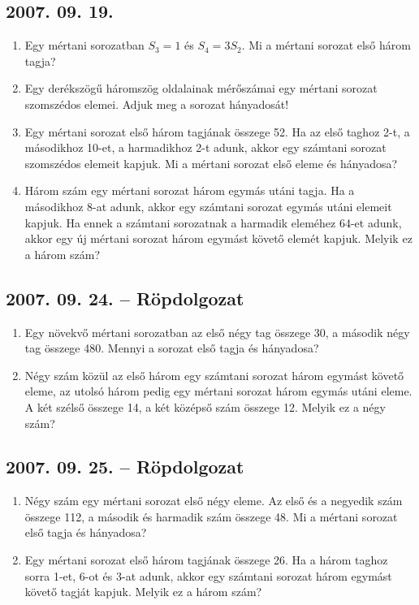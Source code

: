 \subsection*{2007. 09. 19.}
\begin{enumerate}
\item Egy mértani sorozatban $S_3=1$ és $S_4=3S_2$. Mi a mértani sorozat első három tagja?
\item Egy derékszögű háromszög oldalainak mérőszámai egy mértani sorozat szomszédos elemei. Adjuk meg a sorozat hányadosát!
\item Egy mértani sorozat első három tagjának összege 52. Ha az első taghoz 2-t, a másodikhoz 10-et, a harmadikhoz 2-t adunk, akkor egy számtani sorozat szomszédos elemeit kapjuk. Mi a mértani sorozat első eleme és hányadosa?
\item Három szám egy mértani sorozat három egymás utáni tagja. Ha a másodikhoz 8-at adunk, akkor egy számtani sorozat egymás utáni elemeit kapjuk. Ha ennek a számtani sorozatnak a harmadik eleméhez 64-et adunk, akkor egy új mértani sorozat három egymást követő elemét kapjuk. Melyik ez a három szám?
\end{enumerate}

\subsection*{2007. 09. 24. -- Röpdolgozat}
\begin{enumerate}
\item Egy növekvő mértani sorozatban az első négy tag összege 30, a második négy tag összege 480. Mennyi a sorozat 
első tagja és hányadosa?
\item Négy szám közül az első három egy számtani sorozat három egymást követő eleme, az utolsó három pedig egy mértani sorozat
három egymás utáni eleme. A két szélső összege 14, a két középső szám összege 12. Melyik ez a négy szám?
\end{enumerate}

\subsection*{2007. 09. 25. -- Röpdolgozat}
\begin{enumerate}
\item Négy szám egy mértani sorozat első négy eleme. Az első és a negyedik szám összege 112, a második és harmadik szám összege 48. Mi a mértani sorozat első tagja és hányadosa?
\item Egy mértani sorozat első három tagjának összege 26. Ha a három taghoz sorra 1-et, 6-ot és 3-at adunk, akkor egy számtani
sorozat három egymást követő tagját kapjuk. Melyik ez a három szám?
\end{enumerate}

